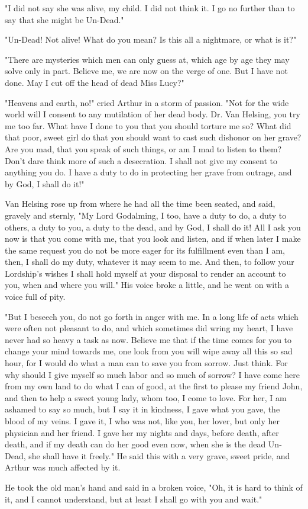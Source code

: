 "I did not say she was alive, my child. I did not think it. I go no further than to say that she might be Un-Dead." 

"Un-Dead! Not alive! What do you mean? Is this all a nightmare, or what is it?" 

"There are mysteries which men can only guess at, which age by age they may solve only in part. Believe me, we are now on the verge of one. But I have not done. May I cut off the head of dead Miss Lucy?" 

"Heavens and earth, no!" cried Arthur in a storm of passion. "Not for the wide world will I consent to any mutilation of her dead body. Dr. Van Helsing, you try me too far. What have I done to you that you should torture me so? What did that poor, sweet girl do that you should want to cast such dishonor on her grave? Are you mad, that you speak of such things, or am I mad to listen to them? Don't dare think more of such a desecration. I shall not give my consent to anything you do. I have a duty to do in protecting her grave from outrage, and by God, I shall do it!" 

Van Helsing rose up from where he had all the time been seated, and said, gravely and sternly, "My Lord Godalming, I too, have a duty to do, a duty to others, a duty to you, a duty to the dead, and by God, I shall do it! All I ask you now is that you come with me, that you look and listen, and if when later I make the same request you do not be more eager for its fulfillment even than I am, then, I shall do my duty, whatever it may seem to me. And then, to follow your Lordship's wishes I shall hold myself at your disposal to render an account to you, when and where you will." His voice broke a little, and he went on with a voice full of pity. 

"But I beseech you, do not go forth in anger with me. In a long life of acts which were often not pleasant to do, and which sometimes did wring my heart, I have never had so heavy a task as now. Believe me that if the time comes for you to change your mind towards me, one look from you will wipe away all this so sad hour, for I would do what a man can to save you from sorrow. Just think. For why should I give myself so much labor and so much of sorrow? I have come here from my own land to do what I can of good, at the first to please my friend John, and then to help a sweet young lady, whom too, I come to love. For her, I am ashamed to say so much, but I say it in kindness, I gave what you gave, the blood of my veins. I gave it, I who was not, like you, her lover, but only her physician and her friend. I gave her my nights and days, before death, after death, and if my death can do her good even now, when she is the dead Un-Dead, she shall have it freely." He said this with a very grave, sweet pride, and Arthur was much affected by it. 

He took the old man's hand and said in a broken voice, "Oh, it is hard to think of it, and I cannot understand, but at least I shall go with you and wait." 
